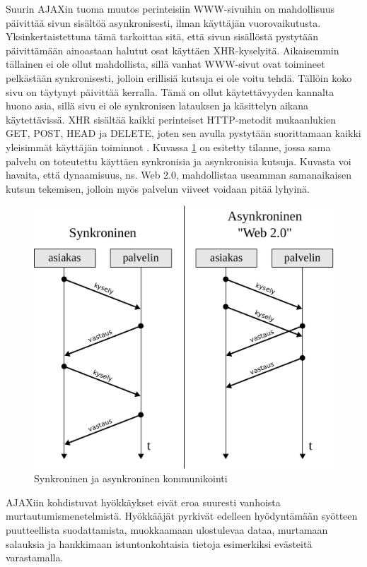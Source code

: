 Suurin AJAXin tuoma muutos perinteisiin WWW-sivuihin on mahdollisuus
päivittää sivun sisältöä asynkronisesti, ilman käyttäjän
vuorovaikutusta. Yksinkertaistettuna tämä tarkoittaa sitä, että sivun
sisällöstä pystytään päivittämään ainoastaan halutut osat käyttäen
XHR-kyselyitä. Aikaisemmin tällainen ei ole ollut mahdollista, sillä
vanhat WWW-sivut ovat toimineet pelkästään synkronisesti, jolloin
erillisiä kutsuja ei ole voitu tehdä. Tällöin koko sivu on täytynyt
päivittää kerralla. Tämä on ollut käytettävyyden kannalta huono asia,
sillä sivu ei ole synkronisen latauksen ja käsittelyn aikana
käytettävissä. XHR sisältää kaikki perinteiset HTTP-metodit
mukaanlukien GET, POST, HEAD ja DELETE, joten sen avulla pystytään
suorittamaan kaikki yleisimmät käyttäjän toiminnot
\cite{WEB2}. Kuvassa \ref{synkroninen} on esitetty tilanne, jossa sama
palvelu on toteutettu käyttäen synkronisia ja asynkronisia
kutsuja. Kuvasta voi havaita, että dynaamisuus, ns. Web 2.0,
mahdollistaa useamman samanaikaisen kutsun tekemisen, jolloin myös
palvelun viiveet voidaan pitää lyhyinä.

\begin{figure}[htp]
\centering
\includegraphics[width=12cm]{pics/synkroninen.pdf}
\caption{Synkroninen ja asynkroninen kommunikointi}
\label{synkroninen}
\end{figure}

AJAXiin kohdistuvat hyökkäykset eivät eroa suuresti vanhoista
murtautumismenetelmistä. Hyökkääjät pyrkivät edelleen hyödyntämään
syötteen puutteellista suodattamista, muokkaamaan ulostulevaa dataa,
murtamaan salauksia ja hankkimaan istuntonkohtaisia tietoja
esimerkiksi evästeitä varastamalla.

